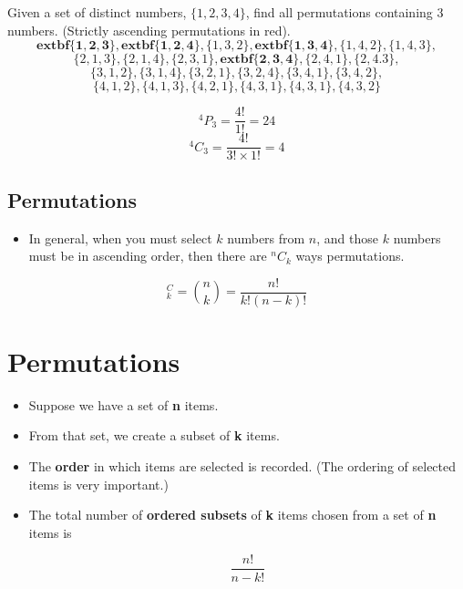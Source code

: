 \documentclass[a4paper,12pt]{article}
\begin{document}
Given a set of distinct numbers, $\{1, 2, 3, 4 \}$, find all permutations containing 3 numbers. (Strictly ascending permutations in red). 
 \[\boldsymbol{	extbf{\{1,2,3\}}}, \boldsymbol{	extbf{\{1,2,4\}}}, \{1,3,2\},\boldsymbol{	extbf{\{1,3,4\}}}, \{1,4,2\},\{1,4,3\},  \]
 \[\{2,1,3\}, \{2,1,4\}, \{2,3,1\},\boldsymbol{	extbf{\{2,3,4\}}}, \{2,4,1\},\{2,4.3\},  \]
 \[\{3,1,2\}, \{3,1,4\}, \{3,2,1\},\{3,2,4\}, \{3,4,1\},\{3,4,2\},  \]
 \[\{4,1,2\}, \{4,1,3\}, \{4,2,1\},\{4,3,1\}, \{4,3,1\},\{4,3,2\}   \]  


\[ ^4P_3 = \frac{4!}{1!} = 24 \]
\[ ^4C_3 = \frac{4!}{3!\times 1!} = 4 \]




\subsection{ Permutations}

\begin{itemize}
\item In general, when you must select $k$ numbers from $n$, and those $k$ numbers must be in ascending order, then there are $^nC_k$ ways permutations.
\end{itemize}
\[ ^C_k = {n \choose k} = \frac{n!}{k!(n-k)!} \]






\section{Permutations}
{
\begin{itemize}

\item Suppose we have a set of \textbf{n} items.
\item From that set, we create a subset of \textbf{k} items.
\item The \textbf{order} in which items are selected is recorded. (The ordering of selected items is very important.) 
\item The total number of \textbf{ordered subsets} of \textbf{k} items chosen from a set of \textbf{n} items is

\[\frac{n!}{n-k!}\]
\end{itemize}
}
\end{document}
